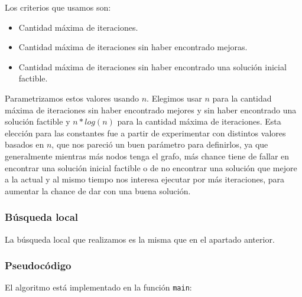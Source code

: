 Los criterios que usamos son:
\begin{itemize}
\item Cantidad máxima de iteraciones.
\item Cantidad máxima de iteraciones sin haber encontrado mejoras.
\item Cantidad máxima de iteraciones sin haber encontrado una solución inicial factible.
\end{itemize}

Parametrizamos estos valores usando $n$. Elegimos usar $n$ para la cantidad máxima de iteraciones sin haber encontrado mejores y sin haber encontrado una solución factible y $n*log(n)$ para la cantidad máxima de iteraciones. Esta elección para las constantes fue a partir de experimentar con distintos valores basados en $n$, que nos pareció un buen parámetro para definirlos, ya que generalmente mientras más nodos tenga el grafo, más chance tiene de fallar en encontrar una solución inicial factible o de no encontrar una solución que mejore a la actual y al mismo tiempo nos interesa ejecutar por más iteraciones, para aumentar la chance de dar con una buena solución. 

\subsubsection{Búsqueda local}

La búsqueda local que realizamos es la misma que en el apartado anterior.

\subsubsection{Pseudocódigo}

El algoritmo está implementado en la función \texttt{main}:

